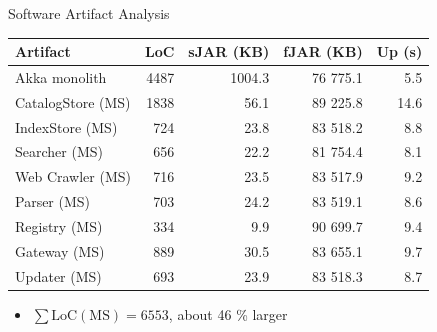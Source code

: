 \documentclass{beamer}
\begin{document}
\begin{frame}{Software Artifact Analysis}

\begin{table}
  \begin{tabular}{l|r|r|r|r}
    \textbf{Artifact} & \textbf{LoC} & \textbf{sJAR (KB)} & \textbf{fJAR (KB)} & \textbf{Up (s)}  \\ \hline
    Akka monolith     & 4487         & 1004.3             & 76 775.1           & 5.5                     \\ \hline
    CatalogStore (MS) & 1838         & 56.1               & 89 225.8           & 14.6                    \\ \hline
    IndexStore (MS)   & 724          & 23.8               & 83 518.2           & 8.8                     \\ \hline
    Searcher (MS)     & 656          & 22.2               & 81 754.4           & 8.1                     \\ \hline
    Web Crawler (MS)  & 716          & 23.5               & 83 517.9           & 9.2                     \\ \hline
    Parser (MS)       & 703          & 24.2               & 83 519.1           & 8.6                     \\ \hline
    Registry (MS)     & 334          & 9.9                & 90 699.7           & 9.4                     \\ \hline
    Gateway (MS)      & 889          & 30.5               & 83 655.1           & 9.7                     \\ \hline
    Updater (MS)      & 693          & 23.9               & 83 518.3           & 8.7                     \\ \hline
  \end{tabular}
\end{table}

\begin{itemize}
  \item $\sum\mbox{LoC}(\mbox{MS}) = 6553$, about 46 \% larger
\end{itemize}

\end{frame}

\end{document}
